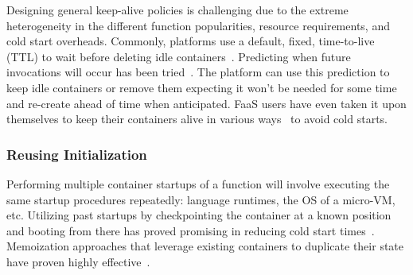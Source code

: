 Designing general keep-alive policies is challenging due to the extreme heterogeneity in the different function popularities, resource requirements, and cold start overheads.
Commonly, platforms use a default, fixed, time-to-live (TTL) to wait before deleting idle containers~\cite{openwhisk}.
Predicting when future invocations will occur has been tried~\cite{shahrad_serverless_2020}.
The platform can use this prediction to keep idle containers or remove them expecting it won't be needed for some time and re-create ahead of time when anticipated.
FaaS users have even taken it upon themselves to keep their containers alive in various ways~\cite{warm2,warm1} to avoid cold starts.



\subsubsection{Reusing Initialization}
Performing multiple container startups of a function will involve executing the same startup procedures repeatedly: language runtimes, the OS of a micro-VM, etc.
Utilizing past startups by checkpointing the container at a known position and booting from there has proved promising in reducing cold start times~\cite{du2020catalyzer,vhive-asplos21}.
Memoization approaches that leverage existing containers to duplicate their state have proven highly effective~\cite{du2020catalyzer,wei2022booting}.

